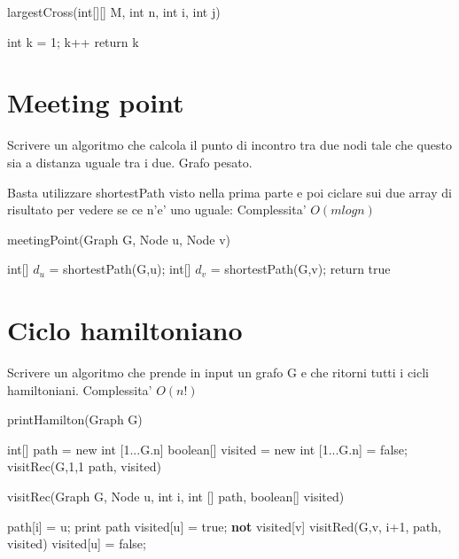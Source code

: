 \documentclass[oneside]{book}
\begin{document}
\begin{algorithm}
\caption{largestCross(int[][] M, int n, int i, int j)}
\begin{algorithmic}
\State int k = 1;
	\State k++
\EndWhile
\State return k
\end{algorithmic}
\end{algorithm}
\section{Meeting point}
Scrivere un algoritmo che calcola il punto di incontro tra due nodi tale che questo sia a distanza uguale tra i due. Grafo pesato.

Basta utilizzare shortestPath visto nella prima parte e poi ciclare sui due array di risultato per vedere se ce n'e' uno uguale:
Complessita' $O(m log n)$
\begin{algorithm}
\caption{meetingPoint(Graph G, Node u, Node v)\label{cap:alg}}
\begin{algorithmic}
\State int[] $d_u$ = shortestPath(G,u);
\State int[] $d_v$ = shortestPath(G,v);
		\State return true
	\EndIf
\EndFor
\end{algorithmic}
\end{algorithm}
\newpage

\section{Ciclo hamiltoniano}
Scrivere un algoritmo che prende in input un grafo G e che ritorni tutti i cicli hamiltoniani.
Complessita' $O(n!)$

\begin{algorithm}
\caption{printHamilton(Graph G)\label{alg:cap}}
\begin{algorithmic}
\State int[] path = new int [1...G.n]
\State boolean[] visited = new int [1...G.n] = false;
\State visitRec(G,1,1 path, visited)
\end{algorithmic}
\end{algorithm}


\begin{algorithm}
\caption{visitRec(Graph G, Node u, int i, int [] path, boolean[] visited)\label{alg:cap}}
\begin{algorithmic}
\State path[i] = u;
		\State print path
	\EndIf
\Else
	\State visited[u] = true;
		\If \textbf{not} visited[v]
			\State visitRed(G,v, i+1, path, visited)
		\EndIf
		\State visited[u] = false;
	\EndFor
\EndIf


\end{algorithmic}
\end{algorithm}
\end{document}
